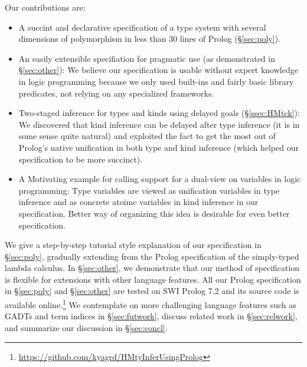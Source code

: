 Our contributions are:
\begin{itemize}\vspace*{-1ex}
\item A succint and declarative specification of
	a type system with several dimensions of polymorphism
	in less than 30 lines of Prolog (\S\ref{sec:poly}).
\item An easily extensible specifiation for pragmatic use
	(as demonstrated in \S\ref{sec:other}):
We believe our specification is usable without expert knowledge
in logic programming because we only used built-ins and fairly basic
library predicates, not relying on any specialized frameworks.
\item Two-staged inference for types and kinds using delayed goals
	(\S\ref{ssec:HMtck}):
We discovered that kind inference can be delayed after type inference
(it is in some sense quite natural) and exploited the fact to get the
most out of Prolog's native unification in both type and kind inference
(which helped our specification to be more succinct).
\item A Motivating example for calling support for a dual-view
	on variables in logic programming:
Type variables are viewed as unification variables
in type inference and as concrete atoimc variables
in kind inference in our specification.
Better way of organizing this idea is desirable
for even better specification.
\end{itemize}

We give a step-by-step tutorial style explanation of our specification in
\S\ref{sec:poly}, gradually extending from the Prolog specification of
the simply-typed lambda calculus. In \S\ref{sec:other}, we demonstrate
that our method of specification is flexible for extensions with
other language features. All our Prolog specification in \S\ref{sec:poly}
and \S\ref{sec:other} are tested on SWI Prolog 7.2 and its source code is
available online.\footnote{
	\url{https://github.com/kyagrd/HMtyInferUsingProlog} }
We contemplate on more challenging language features such as GADTs and
term indices in \S\ref{sec:futwork}, discuss related work in
\S\ref{sec:relwork}, and summarize our discussion in \S\ref{sec:concl}.




